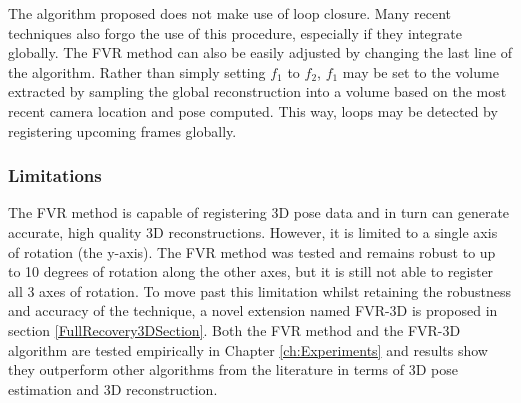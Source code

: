 The algorithm proposed does not make use of loop closure. Many recent techniques also forgo the use of this procedure, especially if they integrate globally. The FVR method can also be easily adjusted by changing the last line of the algorithm. Rather than simply setting $f_1$ to $f_2$, $f_1$ may be set to the volume extracted by sampling the global reconstruction into a volume based on the most recent camera location and pose computed. This way, loops may be detected by registering upcoming frames globally. \\


\subsubsection{Limitations}

The FVR method is capable of registering 3D pose data and in turn can generate accurate, high quality 3D reconstructions. However, it is limited to a single axis of rotation (the y-axis). The FVR method was tested and remains robust to up to 10 degrees of rotation along the other axes, but it is still not able to register all 3 axes of rotation. To move past this limitation whilst retaining the robustness and accuracy of the technique, a novel extension named FVR-3D is proposed in section \ref{FullRecovery3DSection}. Both the FVR method and the FVR-3D algorithm are tested empirically in Chapter \ref{ch:Experiments} and results show they outperform other algorithms from the literature in terms of 3D pose estimation and 3D reconstruction. \\